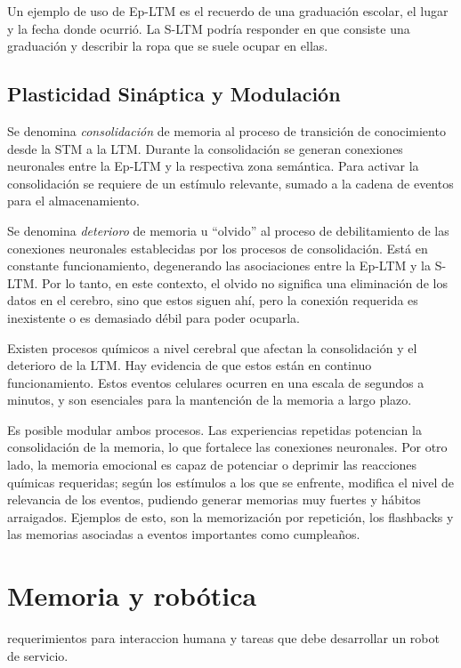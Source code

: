 Un ejemplo de uso de Ep-LTM es el recuerdo de una graduaci\'on escolar, el lugar y la fecha donde ocurri\'o. La S-LTM podr\'ia responder en que consiste una graduaci\'on y describir la ropa que se suele ocupar en ellas.


\subsection{Plasticidad Sin\'aptica y Modulaci\'on}

Se denomina \textit{consolidaci\'on} de memoria al proceso de transici\'on de conocimiento desde la STM a la LTM. Durante la consolidaci\'on se generan conexiones neuronales entre la Ep-LTM y la respectiva zona sem\'antica. Para activar la consolidaci\'on se requiere de un est\'imulo relevante, sumado a la cadena de eventos para el almacenamiento.

Se denomina \textit{deterioro} de memoria u ``olvido'' al proceso de debilitamiento de las conexiones neuronales establecidas por los procesos de consolidaci\'on. Est\'a en constante funcionamiento, degenerando las asociaciones entre la Ep-LTM y la S-LTM. Por lo tanto, en este contexto, el olvido no significa una eliminaci\'on de los datos en el cerebro, sino que estos siguen ah\'i, pero la conexi\'on requerida es inexistente o es demasiado d\'ebil para poder ocuparla.

Existen procesos qu\'imicos a nivel cerebral que afectan la consolidaci\'on y el deterioro de la LTM. Hay evidencia de que estos est\'an en continuo funcionamiento. Estos eventos celulares ocurren en una escala de segundos a minutos, y son esenciales para la mantenci\'on de la memoria a largo plazo.

Es posible modular ambos procesos. Las experiencias repetidas potencian la consolidaci\'on de la memoria, lo que fortalece las conexiones neuronales. Por otro lado, la memoria emocional es capaz de potenciar o deprimir las reacciones qu\'imicas requeridas; seg\'un los est\'imulos a los que se enfrente, modifica el nivel de relevancia de los eventos, pudiendo generar memorias muy fuertes y h\'abitos arraigados. Ejemplos de esto, son la memorizaci\'on por repetici\'on, los flashbacks y las memorias asociadas a eventos importantes como cumplea\~nos.


\section{Memoria y rob\'otica}

requerimientos para interaccion humana y tareas que debe desarrollar un robot de servicio.
%

